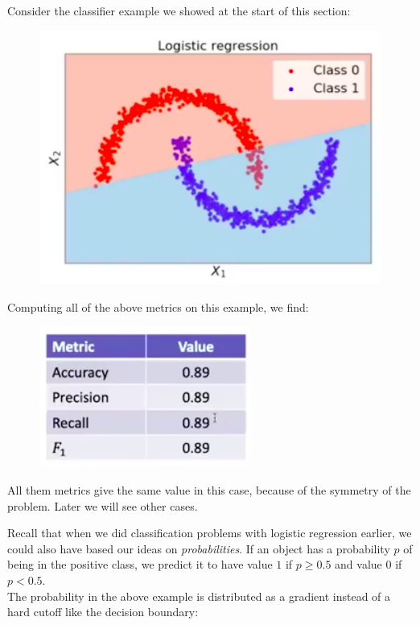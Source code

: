 \begin{frameex}
Consider the classifier example we showed at the start of this section:
\begin{figure}[H]
\centering 
\includegraphics[scale=0.4]{classcomparison.png}
\end{figure}
Computing all of the above metrics on this example, we find:
\begin{figure}[H]
\centering
\includegraphics[scale=0.4]{classcomparison2.png}
\end{figure}
All them metrics give the same value in this case, because of the symmetry of the problem. Later we will see other cases.
\end{frameex}



\newpage
Recall that when we did classification problems with logistic regression earlier, we could also have based our ideas on \textit{probabilities}. If an object has a probability $p$ of being in the positive class, we predict it to have value $1$ if $p \geq 0.5$ and value $0$ if $p < 0.5$.\\

The probability in the above example is distributed as a gradient instead of a hard cutoff like the decision boundary:


